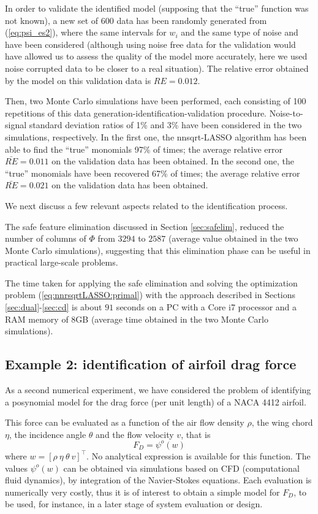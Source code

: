 \documentclass[11pt]{article}
\begin{document}
In order to validate the identified model (supposing that the ``true''
function was not known), a new set of $600$ data has been randomly
generated from (\ref{eq:psi_es2}), where 
the same intervals for $w_{i}$ and the same type of noise and have been considered (although using noise free data for the validation would have allowed
us to assess the quality of the model more accurately, here we used
noise corrupted data to be closer to a real situation). The relative
error obtained by the model on this validation data is $RE=0.012$.

Then, two Monte Carlo simulations have been performed, each consisting
of 100 repetitions of this data generation-identification-validation
procedure. Noise-to-signal standard deviation ratios of 1\% and 3\%
have been considered in the two simulations, respectively. In the
first one, the nnsqrt-LASSO algorithm has been able to find the ``true''
monomials 97\% of times; the average relative error $\bar{RE}=0.011$
on the validation data has been obtained. In the second one, the ``true''
monomials have been recovered 67\% of times; the average relative
error $\bar{RE}=0.021$ on the validation data has been obtained.

We next discuss a few relevant aspects related to the identification
process.

The safe feature elimination discussed in Section \ref{sec:safelim},
reduced the number of columns of $\Phi$ from $3294$ to $2587$ (average
value obtained in the two Monte Carlo simulations), suggesting that
this elimination phase can be useful in practical large-scale problems.

The time taken for applying the safe elimination and solving the optimization
problem (\ref{eq:nnrsqrtLASSO:primal}) with the approach described
in Sections \ref{sec:dual}-\ref{sec:cd} is about $91$ seconds on
a PC with a Core i7 processor and a RAM memory of 8GB (average time
obtained in the two Monte Carlo simulations).

\subsection{Example 2: identification of airfoil drag force}

As a second numerical experiment, we have considered the problem of identifying
a posynomial model for the drag force (per unit length) of a NACA
4412 airfoil. 

This force can be evaluated as a function of the air flow
density $\rho$, the wing chord $\eta$, the incidence angle $\theta$
and the flow velocity $v$, that is 
\[
F_{D}=\psi^{o}(w)
\]
where $w=[\rho\:\eta\:\theta\: v]^{\top}$. No analytical expression is available for this function. The values $\psi^{o}(w)$
can be obtained via simulations based on CFD (computational fluid dynamics),
by integration of the Navier-Stokes equations. Each evaluation is
numerically very costly, thus it is of interest to obtain a simple
model for $F_{D}$, to be used, for instance, in a later stage of
system evaluation or design. 
\end{document}
